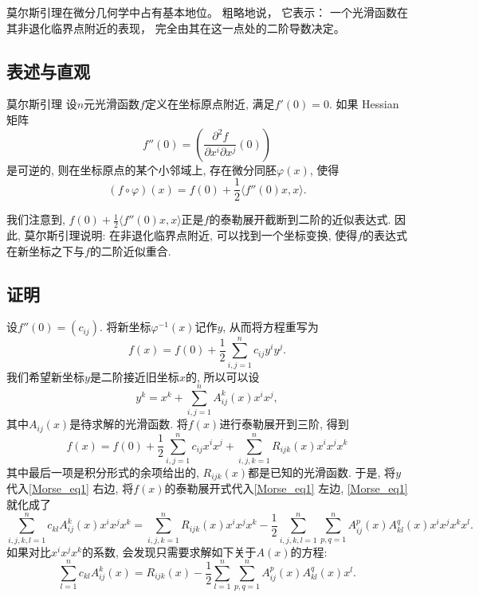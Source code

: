 
\begin{issues}
\issueTODO
\issueDraft
\end{issues}


莫尔斯引理在微分几何学中占有基本地位。 粗略地说， 它表示： 一个光滑函数在其非退化临界点附近的表现， 完全由其在这一点处的二阶导数决定。

\subsection{表述与直观}
\begin{lemma}{莫尔斯引理}
设$n$元光滑函数$f$定义在坐标原点附近, 满足$f'(0)=0$. 如果 Hessian 矩阵
$$
f''(0)=\left(\frac{\partial^2f}{\partial x^i\partial x^j}(0)\right)
$$
是可逆的, 则在坐标原点的某个小邻域上, 存在微分同胚$\varphi(x)$, 使得
$$
(f\circ\varphi)(x)=f(0)+\frac{1}{2}\langle f''(0)x,x\rangle.
$$
\end{lemma}

我们注意到, $f(0)+\frac{1}{2}\langle f''(0)x,x\rangle$正是$f$的泰勒展开截断到二阶的近似表达式. 因此, 莫尔斯引理说明: 在非退化临界点附近, 可以找到一个坐标变换, 使得$f$的表达式在新坐标之下与$f$的二阶近似重合.

\subsection{证明}
设$f''(0)=(c_{ij})$. 将新坐标$\varphi^{-1}(x)$记作$y$, 从而将方程重写为
\begin{equation}\label{Morse_eq1}
f(x)=f(0)+\frac{1}{2}\sum_{i,j=1}^nc_{ij}y^iy^j.
\end{equation}
我们希望新坐标$y$是二阶接近旧坐标$x$的, 所以可以设
$$
y^k
=x^k+\sum_{i,j=1}^nA^k_{ij}(x)x^ix^j,
$$
其中$A_{ij}(x)$是待求解的光滑函数. 将$f(x)$进行泰勒展开到三阶, 得到
$$
f(x)=f(0)+\frac{1}{2}\sum_{i,j=1}^nc_{ij}x^ix^j+
\sum_{i,j,k=1}^nR_{ijk}(x)x^ix^jx^k
$$
其中最后一项是积分形式的余项给出的, $R_{ijk}(x)$都是已知的光滑函数. 于是, 将$y$代入\autoref{Morse_eq1} 右边, 将$f(x)$的泰勒展开式代入\autoref{Morse_eq1} 左边, \autoref{Morse_eq1} 就化成了
$$
\sum_{i,j,k,l=1}^nc_{kl}A^k_{ij}(x)x^ix^jx^k
=\sum_{i,j,k=1}^nR_{ijk}(x)x^ix^jx^k
-\frac{1}{2}\sum_{i,j,k,l=1}^n\sum_{p,q=1}^nA^p_{ij}(x)A^q_{kl}(x)x^ix^jx^kx^l.
$$
如果对比$x^ix^jx^k$的系数, 会发现只需要求解如下关于$A(x)$的方程:
$$
\sum_{l=1}^nc_{kl}A^k_{ij}(x)
=R_{ijk}(x)
-\frac{1}{2}\sum_{l=1}^n\sum_{p,q=1}^nA^p_{ij}(x)A^q_{kl}(x)x^l.
$$